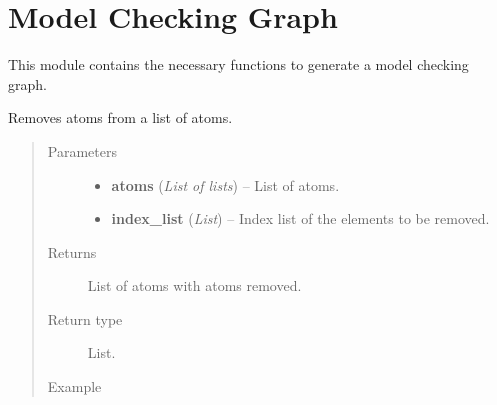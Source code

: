 \documentclass[letterpaper,10pt,english]{sphinxmanual}
\begin{document}
\chapter{Model Checking Graph}
\label{modelCheckingGraph:module-modelCheckingGraph}\label{modelCheckingGraph:model-checking-graph}\label{modelCheckingGraph::doc}
This module contains the necessary functions to generate a model checking graph.

\begin{fulllineitems}
\label{modelCheckingGraph:modelCheckingGraph.deleteAtoms}
Removes atoms from a list of atoms.
\begin{quote}\begin{description}
\item[{Parameters}] \leavevmode\begin{itemize}
\item {} 
\textbf{atoms} (\emph{List of lists}) -- List of atoms.

\item {} 
\textbf{index\_list} (\emph{List}) -- Index list of the elements to be removed.

\end{itemize}

\item[{Returns}] \leavevmode
List of atoms with atoms removed.

\item[{Return type}] \leavevmode
List.

\item[{Example }] \leavevmode
\end{description}\end{quote}


\end{fulllineitems}
\end{document}
